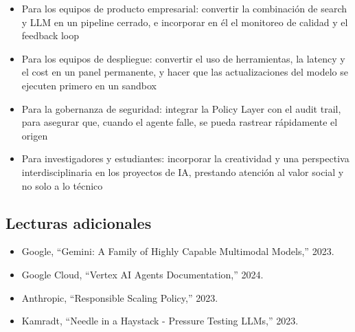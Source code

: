 \begin{itemize}
    \item Para los equipos de producto empresarial: convertir la combinación de search y LLM en un pipeline cerrado, e incorporar en él el monitoreo de calidad y el feedback loop
    \item Para los equipos de despliegue: convertir el uso de herramientas, la latency y el cost en un panel permanente, y hacer que las actualizaciones del modelo se ejecuten primero en un sandbox
    \item Para la gobernanza de seguridad: integrar la Policy Layer con el audit trail, para asegurar que, cuando el agente falle, se pueda rastrear rápidamente el origen
    \item Para investigadores y estudiantes: incorporar la creatividad y una perspectiva interdisciplinaria en los proyectos de IA, prestando atención al valor social y no solo a lo técnico
\end{itemize}

\subsection{Lecturas adicionales}

\begin{itemize}
    \item Google, ``Gemini: A Family of Highly Capable Multimodal Models,'' 2023.
    \item Google Cloud, ``Vertex AI Agents Documentation,'' 2024.
    \item Anthropic, ``Responsible Scaling Policy,'' 2023.
    \item Kamradt, ``Needle in a Haystack - Pressure Testing LLMs,'' 2023.
\end{itemize}


